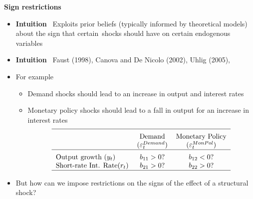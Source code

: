 \documentclass[10pt,english,t,aspectratio=169,ignorenonframetext]{beamer}
\begin{document}

\begin{frame}
{\textbf{Sign restrictions}}\vspace{-.2cm}

\begin{itemize}
\item \textbf{Intuition} \ Exploits prior beliefs (typically informed by
theoretical models) about the sign that certain\smallskip\ shocks should
have on certain endogenous variables\medskip

\item \textbf{Intuition} \ Faust (1998), Canova and De Nicolo (2002), Uhlig (2005), \medskip %
\pause

\item For example\smallskip

\begin{itemize}
\item Demand shocks should lead to an increase in output and interest rates
\medskip

\item Monetary policy shocks should lead to a fall in output for an increase
in interest rates 
\begin{equation*}
\begin{tabular}{lcc}
\hline
\addlinespace & Demand & Monetary Policy \\ 
& ($\varepsilon _{t}^{Demand}$) & ($\varepsilon _{t}^{MonPol}$) \\ \hline
\addlinespace Output growth ($y_{t}$) & $b_{11}>0$? & $b_{12}<0$? \\ 
Short-rate Int. Rate($r_{t}$) & $b_{21}>0$? & $b_{22}>0$? \\ \hline
\end{tabular}%
\end{equation*}%
\pause\medskip
\end{itemize}

\item But how can we impose restrictions on the signs of the effect of a
structural shock?
\end{itemize}
\end{frame}

\end{document}
